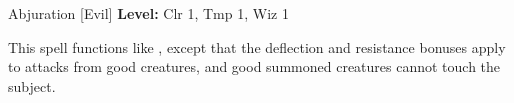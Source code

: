 {Abjuration [Evil]}
{
	\textbf{Level:}
	Clr 1, Tmp 1, Wiz 1\\
}
{
	This spell functions like , except that the deflection and resistance bonuses apply to attacks from good creatures, and good summoned creatures cannot touch the subject.

}
